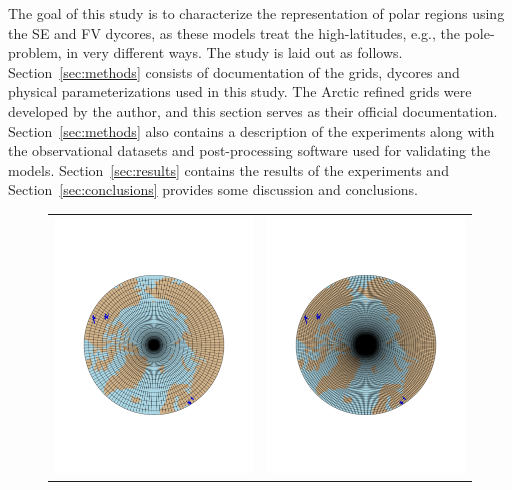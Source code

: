 \documentclass[draft]{agujournal2019}
\begin{document}
The goal of this study is to characterize the representation of polar regions using the SE and FV dycores, as these models treat the high-latitudes, e.g., the pole-problem, in very different ways. The study is laid out as follows. Section~\ref{sec:methods} consists of documentation of the grids, dycores and physical parameterizations used in this study. The Arctic refined grids were developed by the author, and this section serves as their official documentation. Section~\ref{sec:methods} also contains a description of the experiments along with the observational datasets and post-processing software used for validating the models. Section~\ref{sec:results} contains the results of the experiments and Section~\ref{sec:conclusions} provides some discussion and conclusions. 

\begin{figure}[t]
\begin{center}
\begin{tabular}{cc}
         \includegraphics[width=60mm]{figs/grid-f19.pdf}&
         \includegraphics[width=60mm]{figs/grid-f09.pdf}\\

\end{tabular}
\end{center}
\end{figure}
\end{document}
